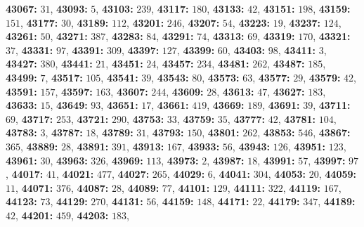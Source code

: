 \textsf{\bfseries 43067:} $31$, \textsf{\bfseries 43093:} $5$, \textsf{\bfseries 43103:} $239$, \textsf{\bfseries 43117:} $180$, \textsf{\bfseries 43133:} $42$, \textsf{\bfseries 43151:} $198$, \textsf{\bfseries 43159:} $151$, \textsf{\bfseries 43177:} $30$, \textsf{\bfseries 43189:} $112$, \textsf{\bfseries 43201:} $246$, \textsf{\bfseries 43207:} $54$, \textsf{\bfseries 43223:} $19$, \textsf{\bfseries 43237:} $124$, \textsf{\bfseries 43261:} $50$, \textsf{\bfseries 43271:} $387$, \textsf{\bfseries 43283:} $84$, \textsf{\bfseries 43291:} $74$, \textsf{\bfseries 43313:} $69$, \textsf{\bfseries 43319:} $170$, \textsf{\bfseries 43321:} $37$, \textsf{\bfseries 43331:} $97$, \textsf{\bfseries 43391:} $309$, \textsf{\bfseries 43397:} $127$, \textsf{\bfseries 43399:} $60$, \textsf{\bfseries 43403:} $98$, \textsf{\bfseries 43411:} $3$, \textsf{\bfseries 43427:} $380$, \textsf{\bfseries 43441:} $21$, \textsf{\bfseries 43451:} $24$, \textsf{\bfseries 43457:} $234$, \textsf{\bfseries 43481:} $262$, \textsf{\bfseries 43487:} $185$, \textsf{\bfseries 43499:} $7$, \textsf{\bfseries 43517:} $105$, \textsf{\bfseries 43541:} $39$, \textsf{\bfseries 43543:} $80$, \textsf{\bfseries 43573:} $63$, \textsf{\bfseries 43577:} $29$, \textsf{\bfseries 43579:} $42$, \textsf{\bfseries 43591:} $157$, \textsf{\bfseries 43597:} $163$, \textsf{\bfseries 43607:} $244$, \textsf{\bfseries 43609:} $28$, \textsf{\bfseries 43613:} $47$, \textsf{\bfseries 43627:} $183$, \textsf{\bfseries 43633:} $15$, \textsf{\bfseries 43649:} $93$, \textsf{\bfseries 43651:} $17$, \textsf{\bfseries 43661:} $419$, \textsf{\bfseries 43669:} $189$, \textsf{\bfseries 43691:} $39$, \textsf{\bfseries 43711:} $69$, \textsf{\bfseries 43717:} $253$, \textsf{\bfseries 43721:} $290$, \textsf{\bfseries 43753:} $33$, \textsf{\bfseries 43759:} $35$, \textsf{\bfseries 43777:} $42$, \textsf{\bfseries 43781:} $104$, \textsf{\bfseries 43783:} $3$, \textsf{\bfseries 43787:} $18$, \textsf{\bfseries 43789:} $31$, \textsf{\bfseries 43793:} $150$, \textsf{\bfseries 43801:} $262$, \textsf{\bfseries 43853:} $546$, \textsf{\bfseries 43867:} $365$, \textsf{\bfseries 43889:} $28$, \textsf{\bfseries 43891:} $391$, \textsf{\bfseries 43913:} $167$, \textsf{\bfseries 43933:} $56$, \textsf{\bfseries 43943:} $126$, \textsf{\bfseries 43951:} $123$, \textsf{\bfseries 43961:} $30$, \textsf{\bfseries 43963:} $326$, \textsf{\bfseries 43969:} $113$, \textsf{\bfseries 43973:} $2$, \textsf{\bfseries 43987:} $18$, \textsf{\bfseries 43991:} $57$, \textsf{\bfseries 43997:} $97$, \textsf{\bfseries 44017:} $41$, \textsf{\bfseries 44021:} $477$, \textsf{\bfseries 44027:} $265$, \textsf{\bfseries 44029:} $6$, \textsf{\bfseries 44041:} $304$, \textsf{\bfseries 44053:} $20$, \textsf{\bfseries 44059:} $11$, \textsf{\bfseries 44071:} $376$, \textsf{\bfseries 44087:} $28$, \textsf{\bfseries 44089:} $77$, \textsf{\bfseries 44101:} $129$, \textsf{\bfseries 44111:} $322$, \textsf{\bfseries 44119:} $167$, \textsf{\bfseries 44123:} $73$, \textsf{\bfseries 44129:} $270$, \textsf{\bfseries 44131:} $56$, \textsf{\bfseries 44159:} $148$, \textsf{\bfseries 44171:} $22$, \textsf{\bfseries 44179:} $347$, \textsf{\bfseries 44189:} $42$, \textsf{\bfseries 44201:} $459$, \textsf{\bfseries 44203:} $183$, 
